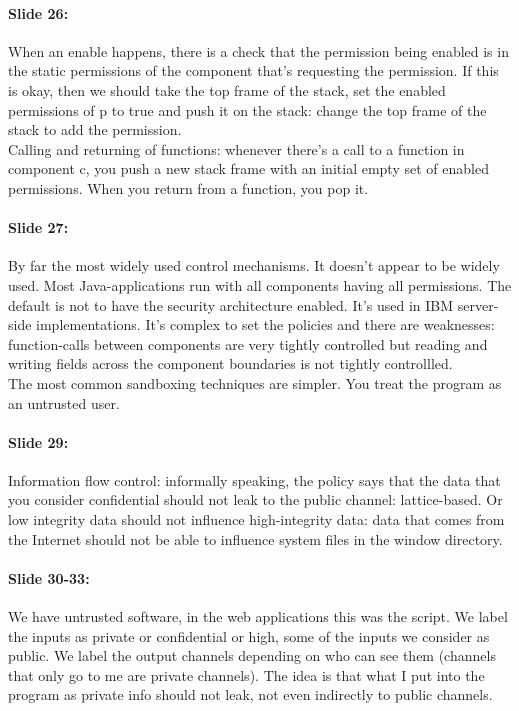 \documentclass[10pt,a4paper]{report}
\begin{document}
\paragraph{Slide 26:} When an enable happens, there is a check that the permission being enabled is in the static permissions of the component that's requesting the permission.  If this is okay, then we should take the top frame of the stack, set the enabled permissions of p to true and push it on the stack: change the top frame of the stack to add the permission.\\
Calling and returning of functions: whenever there's a call to a function in component c, you push a new stack frame with an initial empty set of enabled permissions. When you return from a function, you pop it.

\paragraph{Slide 27:} By far the most widely used control mechanisms. It doesn't appear to be widely used. Most Java-applications run with all components having all permissions. The default is not to have the security architecture enabled. It's used in IBM server-side implementations. It's complex to set the policies and there are weaknesses: function-calls between components are very tightly controlled but reading and writing fields across the component boundaries is not tightly controllled.\\ 
The most common sandboxing techniques are simpler. You treat the program as an untrusted user.

\paragraph{Slide 29:} Information flow control: informally speaking, the policy says that the data that you consider confidential should not leak to the public channel: lattice-based. Or low integrity data should not influence high-integrity data: data that comes from the Internet should not be able to influence system files in the window directory.

\paragraph{Slide 30-33:} We have untrusted software, in the web applications this was the script. We label the inputs as private or confidential or high, some of the inputs we consider as public. We label the output channels depending on who can see them (channels that only go to me are private channels). The idea is that what I put into the program as private  info should not leak, not even indirectly to public channels.
\end{document}
